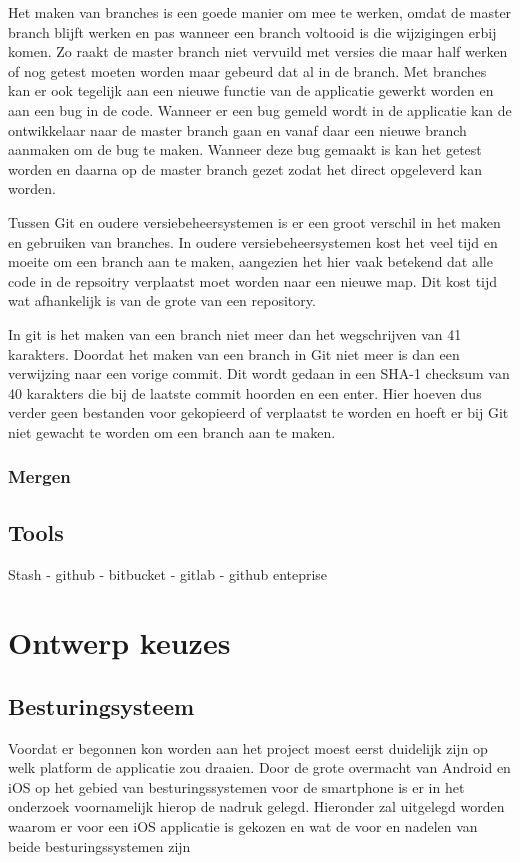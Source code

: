 \documentclass[a4paper,11pt,oneside]{report}
\begin{document}
Het maken van branches is een goede manier om mee te werken, omdat de master branch blijft werken en pas wanneer een branch voltooid is die wijzigingen erbij komen. Zo raakt de master branch niet vervuild met versies die maar half werken of nog getest moeten worden maar gebeurd dat al in de branch. Met branches kan er ook tegelijk aan een nieuwe functie van de applicatie gewerkt worden en aan een bug in de code. Wanneer er een bug gemeld wordt in de applicatie kan de ontwikkelaar naar de master branch gaan en vanaf daar een nieuwe branch aanmaken om de bug te maken. Wanneer deze bug gemaakt is kan het getest worden en daarna op de master branch gezet zodat het direct opgeleverd kan worden.

Tussen Git en oudere versiebeheersystemen is er een groot verschil in het maken en gebruiken van branches. In oudere versiebeheersystemen kost het veel tijd en moeite om een branch aan te maken, aangezien het hier vaak betekend dat alle code in de repsoitry verplaatst moet worden naar een nieuwe map. Dit kost tijd wat afhankelijk is van de grote van een repository. 

In git is het maken van een branch niet meer dan het wegschrijven van 41 karakters. Doordat het maken van een branch in Git niet meer is dan een verwijzing naar een vorige commit. Dit wordt gedaan in een SHA-1 checksum van 40 karakters die bij de laatste commit hoorden en een enter. Hier hoeven dus verder geen bestanden voor gekopieerd of verplaatst te worden en hoeft er bij Git niet gewacht te worden om een branch aan te maken. 

\subsection{Mergen}



\section{Tools}
Stash - github - bitbucket - gitlab - github enteprise


\chapter{Ontwerp keuzes}

\section{Besturingsysteem}
Voordat er begonnen kon worden aan het project moest eerst duidelijk zijn op welk platform de applicatie zou draaien. Door de grote overmacht van Android en iOS op het gebied van besturingssystemen voor de smartphone is er in het onderzoek voornamelijk hierop de nadruk gelegd. Hieronder zal uitgelegd worden waarom er voor een iOS applicatie is gekozen en wat de voor en nadelen van beide besturingssystemen zijn
\end{document}
